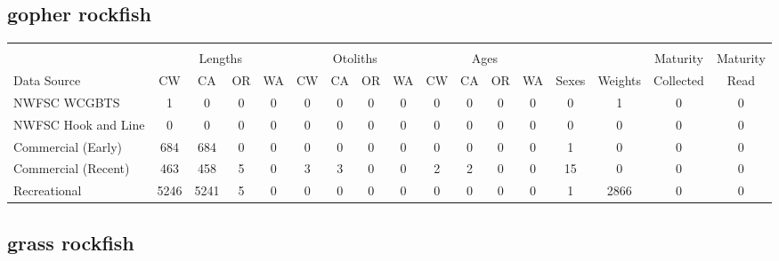 \documentclass[12pt,]{article}
\begin{document}
\FloatBarrier  

\subsection{gopher rockfish}\label{gopher-rockfish}

\begin{table}[ht]
\centering
\begingroup\fontsize{10pt}{10pt}\selectfont
\begin{tabular}{|l|cccc|cccc|cccc|c|c|c|c|}
  \hline
 &  &  &  &  &  &  &  &  &  &  &  &  &  &  &  &  \\ 
   & \multicolumn{4}{c}{Lengths} &  \multicolumn{4}{c}{Otoliths} & \multicolumn{4}{c}{Ages} &  & & Maturity & Maturity\\
 Data Source & CW & CA & OR & WA & CW & CA & OR & WA & CW & CA & OR & WA & Sexes & Weights & Collected & Read\\
 \hline
NWFSC WCGBTS & 1 & 0 & 0 & 0 & 0 & 0 & 0 & 0 & 0 & 0 & 0 & 0 & 0 & 1 & 0 & 0 \\ 
  NWFSC Hook and Line & 0 & 0 & 0 & 0 & 0 & 0 & 0 & 0 & 0 & 0 & 0 & 0 & 0 & 0 & 0 & 0 \\ 
  Commercial (Early) & 684 & 684 & 0 & 0 & 0 & 0 & 0 & 0 & 0 & 0 & 0 & 0 & 1 & 0 & 0 & 0 \\ 
  Commercial (Recent) & 463 & 458 & 5 & 0 & 3 & 3 & 0 & 0 & 2 & 2 & 0 & 0 & 15 & 0 & 0 & 0 \\ 
  Recreational & 5246 & 5241 & 5 & 0 & 0 & 0 & 0 & 0 & 0 & 0 & 0 & 0 & 1 & 2866 & 0 & 0 \\ 
   \hline
\end{tabular}
\endgroup
\end{table}

\FloatBarrier  

\subsection{grass rockfish}\label{grass-rockfish}
\end{document}
